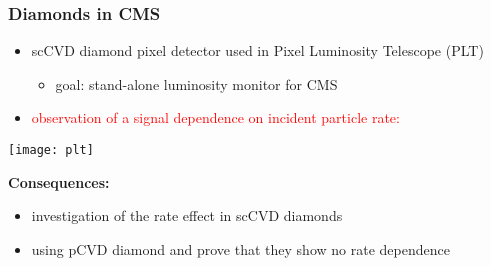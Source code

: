 \begin{frame}
	\frametitle{Diamonds in CMS}
	\begin{itemize}
		\item scCVD diamond pixel detector used in Pixel Luminosity Telescope (PLT)
		\begin{itemize}
			\vspace*{2pt}
			\item goal: stand-alone luminosity monitor for CMS
		\end{itemize}
		\item \textcolor{red}{observation of a signal dependence on incident particle rate:}
	\end{itemize}
	\begin{center}
		\texttt{[image: plt]}
	\end{center}
	\vspace*{-15pt}
	\textbf{Consequences:}
	\begin{itemize}
		\item investigation of the rate effect in scCVD diamonds
		\item using pCVD diamond and prove that they show no rate dependence 
	\end{itemize}
\end{frame}

